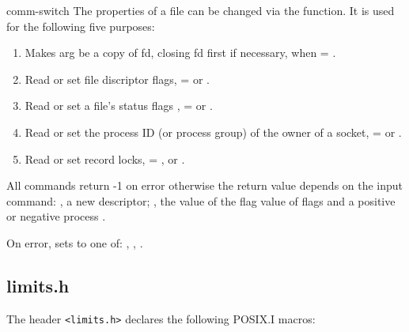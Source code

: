\begin{Ventry2}{comm-switch  }
The properties of a file can be changed via the  function.
It is used for the following five purposes:
\begin{enumerate}
\item Makes arg be a copy of fd, closing  fd  first  if
                necessary, when  = .
\item Read or set file discriptor flags,   =  or .
\item Read or set a file's status flags ,  =  or .
\item Read or set the  process  ID  (or  process group) of the owner of a socket,
         =  or .
\item Read or set  record locks,  = ,
  or . 
\end{enumerate}

All commands return -1 on error otherwise the return value depends on
the input command: , a new descriptor; , the
value of the flag   value of flags and  
a positive or negative process .

On error, sets  to one of: , , .

\end{Ventry2}

\subsection{limits.h}
\label{sec:limitshPosix}

The header \verb+<limits.h>+ declares the following POSIX.I macros:

